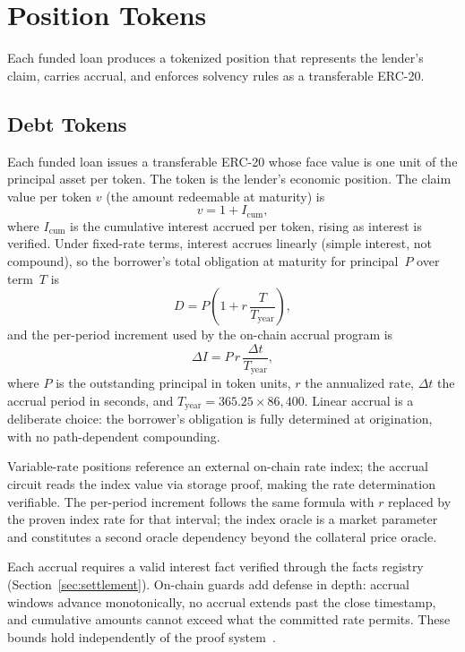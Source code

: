 \section{Position Tokens}
\label{sec:tokens}

Each funded loan produces a tokenized position that represents the lender's claim, carries accrual, and enforces solvency rules as a transferable ERC-20.

\subsection{Debt Tokens}

Each funded loan issues a transferable ERC-20 whose face value is one unit of the principal asset per token. The token is the lender's economic position. The claim value per token $v$ (the amount redeemable at maturity) is
\begin{equation}
  v = 1 + I_{\mathrm{cum}},
  \label{eq:debtprice}
\end{equation}
where $I_{\mathrm{cum}}$ is the cumulative interest accrued per token, rising as interest is verified. Under fixed-rate terms, interest accrues linearly (simple interest, not compound), so the borrower's total obligation at maturity for principal~$P$ over term~$T$ is
\begin{equation}
  D = P\!\left(1 + r\,\frac{T}{T_{\mathrm{year}}}\right),
  \label{eq:totaldebt}
\end{equation}
and the per-period increment used by the on-chain accrual program is
\begin{equation}
  \Delta I = P\, r\, \frac{\Delta t}{T_{\mathrm{year}}},
  \label{eq:interest}
\end{equation}
where $P$ is the outstanding principal in token units, $r$ the annualized rate, $\Delta t$ the accrual period in seconds, and $T_{\mathrm{year}} = 365.25 \times 86{,}400$. Linear accrual is a deliberate choice: the borrower's obligation is fully determined at origination, with no path-dependent compounding.

Variable-rate positions reference an external on-chain rate index; the accrual circuit reads the index value via storage proof, making the rate determination verifiable. The per-period increment follows the same formula with $r$ replaced by the proven index rate for that interval; the index oracle is a market parameter and constitutes a second oracle dependency beyond the collateral price oracle.

Each accrual requires a valid interest fact verified through the facts registry (Section~\ref{sec:settlement}). On-chain guards add defense in depth: accrual windows advance monotonically, no accrual extends past the close timestamp, and cumulative amounts cannot exceed what the committed rate permits. These bounds hold independently of the proof system~\cite{daloc-decent2026}.

